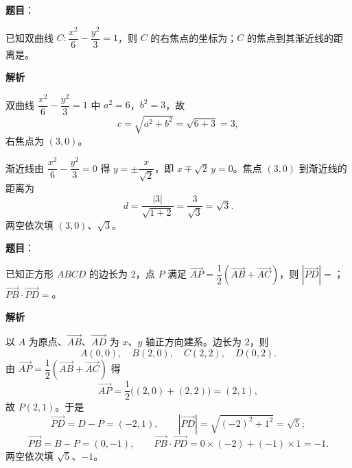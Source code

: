 \begin{answer}

\textbf{题目}：

已知双曲线 $C:\dfrac{x^2}6-\dfrac{y^2}3=1$，则 $C$ 的右焦点的坐标为\gkblank{}；$C$ 的焦点到其渐近线的距离是\gkblank{}。

\textbf{解析}

双曲线 $\dfrac{x^2}6-\dfrac{y^2}3=1$ 中 $a^2=6$，$b^2=3$，故
\nopagebreak[4]
\[c=\sqrt{a^2+b^2}=\sqrt{6+3}=3,\]
右焦点为 $(3,0)$。

渐近线由 $\dfrac{x^2}6-\dfrac{y^2}3=0$ 得 $y=\pm\dfrac{x}{\sqrt2}$，即 $x\mp\sqrt2\,y=0$。焦点 $(3,0)$ 到渐近线的距离为
\nopagebreak[4]
\[d=\frac{|3|}{\sqrt{1+2}}=\frac3{\sqrt3}=\sqrt3 .\]
两空依次填 $(3,0)$、$\sqrt3$。


\end{answer}
\begin{answer}

\textbf{题目}：

已知正方形 $ABCD$ 的边长为 $2$，点 $P$ 满足 $\overrightarrow{AP}=\dfrac12\left(\overrightarrow{AB}+\overrightarrow{AC}\right)$，则 $|\overrightarrow{PD}|=$\gkblank{}；$\overrightarrow{PB}\cdot\overrightarrow{PD}=$\gkblank{}。

\textbf{解析}

以 $A$ 为原点、$\overrightarrow{AB}$、$\overrightarrow{AD}$ 为 $x$、$y$ 轴正方向建系。边长为 $2$，则
\nopagebreak[4]
\[A(0,0),\quad B(2,0),\quad C(2,2),\quad D(0,2).\]
由 $\overrightarrow{AP}=\dfrac12\left(\overrightarrow{AB}+\overrightarrow{AC}\right)$ 得
\nopagebreak[4]
\[\overrightarrow{AP}=\frac12\bigl((2,0)+(2,2)\bigr)=(2,1),\]
故 $P(2,1)$。于是
\nopagebreak[4]
\[\overrightarrow{PD}=D-P=(-2,1),\qquad |\overrightarrow{PD}|=\sqrt{(-2)^2+1^2}=\sqrt5 ;\]
\nopagebreak[4]
\[\overrightarrow{PB}=B-P=(0,-1),\qquad \overrightarrow{PB}\cdot\overrightarrow{PD}=0\times(-2)+(-1)\times1=-1 .\]
两空依次填 $\sqrt5$、$-1$。


\end{answer}

